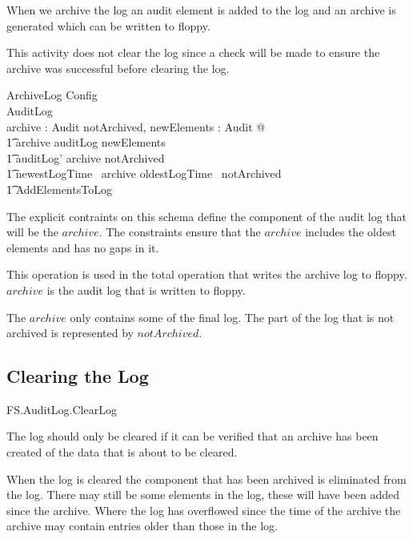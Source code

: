 When we archive the log an audit element is added to the log and an
archive is generated which can be written to floppy. 

This activity does not clear the log since a check will be made to
ensure the archive was successful before clearing the log.

\begin{schema}{ArchiveLog}
        Config
\\      \Delta AuditLog
\\      archive : \finset Audit
\where
        \exists  notArchived,
        newElements : \finset Audit @
\\ \t1           archive \subseteq auditLog \cup newElements
\\ \t1          \land auditLog' \subseteq archive \cup notArchived
\\ \t1          \land newestLogTime~ archive \leq oldestLogTime~ notArchived 
\\ \t1          \land AddElementsToLog
\end{schema}
\begin{Zcomment}
\item
The explicit contraints on this schema define the component of the
audit log that will be the $archive$. The constraints ensure that the
$archive$ includes the oldest elements and has no gaps in it.
\item
This operation is used in the total operation that writes the archive
log to floppy. $archive$ is the audit log that is written to floppy.
\item
The $archive$ only contains some of the final log. The part of the log that is
not archived is represented by $notArchived$.
\end{Zcomment}

\subsection{Clearing the Log}

\begin{traceunit}{FS.AuditLog.ClearLog}
\end{traceunit}

The log should only be cleared if it can be verified that an archive
has been created of the data that is about to be cleared.

When the log is cleared the component that has been archived is
eliminated from the log. There may still be some elements in the log,
these will have been added since the archive. Where the log has
overflowed since the time of the archive the archive may contain
entries older than those in the log.

